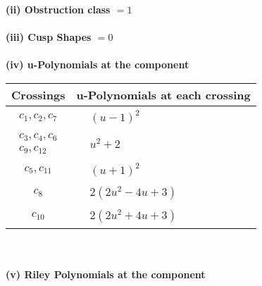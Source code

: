 \documentclass[1p]{elsarticle_modified}
\theoremstyle{definition}
\begin{document}
\flushleft \textbf{(ii) Obstruction class $= 1$}\\~\\
\flushleft \textbf{(iii) Cusp Shapes $= 0$}\\~\\
\newpage\renewcommand{\arraystretch}{1}
\flushleft \textbf{(iv) u-Polynomials at the component}\newline \\
\begin{tabular}{m{50pt}|m{274pt}}
Crossings & \hspace{64pt}u-Polynomials at each crossing \\
\hline $$\begin{aligned}c_{1},c_{2},c_{7}\end{aligned}$$&$\begin{aligned}
&(u-1)^2
\end{aligned}$\\
\hline $$\begin{aligned}c_{3},c_{4},c_{6}\\c_{9},c_{12}\end{aligned}$$&$\begin{aligned}
&u^2+2
\end{aligned}$\\
\hline $$\begin{aligned}c_{5},c_{11}\end{aligned}$$&$\begin{aligned}
&(u+1)^2
\end{aligned}$\\
\hline $$\begin{aligned}c_{8}\end{aligned}$$&$\begin{aligned}
&2(2 u^2-4 u+3)
\end{aligned}$\\
\hline $$\begin{aligned}c_{10}\end{aligned}$$&$\begin{aligned}
&2(2 u^2+4 u+3)
\end{aligned}$\\
\hline
\end{tabular}\\~\\
\newpage\renewcommand{\arraystretch}{1}
\flushleft \textbf{(v) Riley Polynomials at the component}\newline \\
\end{document}
